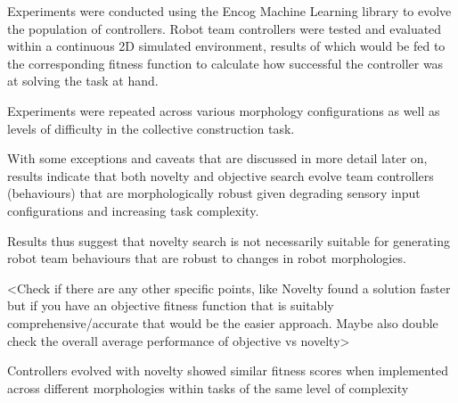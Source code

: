 Experiments were conducted using the Encog Machine Learning library to evolve the population of controllers. Robot team controllers were tested and evaluated within a continuous 2D simulated environment, results of which would be fed to the corresponding fitness function to calculate how successful the controller was at solving the task at hand.

Experiments were repeated across various morphology configurations as well as levels of difficulty in the collective construction task.

With some exceptions and caveats that are discussed in more detail later on, results indicate that both novelty and objective search evolve team controllers (behaviours) that are morphologically robust given degrading sensory input configurations and increasing task complexity.

Results thus suggest that novelty search is not necessarily suitable for generating robot team behaviours that are robust to changes in robot morphologies.

<Check if there are any other specific points, like Novelty found a solution faster but if you have an objective fitness function that is suitably comprehensive/accurate that would be the easier approach. Maybe also double check the overall average performance of objective vs novelty>

Controllers evolved with novelty showed similar fitness scores when implemented across different morphologies within tasks of the same level of complexity
